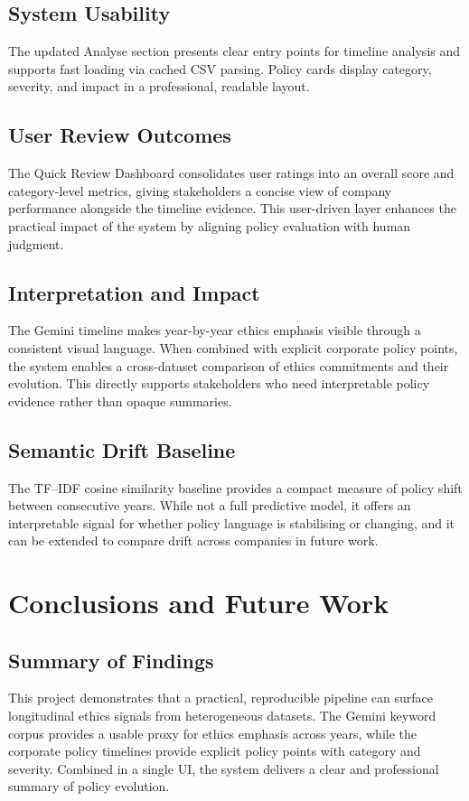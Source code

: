 \documentclass[conference]{IEEEtran}
\begin{document}
\subsection*{System Usability}
The updated Analyse section presents clear entry points for timeline analysis
and supports fast loading via cached CSV parsing. Policy cards display
category, severity, and impact in a professional, readable layout.

\subsection*{User Review Outcomes}
The Quick Review Dashboard consolidates user ratings into an overall score and
category-level metrics, giving stakeholders a concise view of company
performance alongside the timeline evidence. This user-driven layer enhances
the practical impact of the system by aligning policy evaluation with human
judgment.

\subsection*{Interpretation and Impact}
The Gemini timeline makes year-by-year ethics emphasis visible through a
consistent visual language. When combined with explicit corporate policy
points, the system enables a cross-dataset comparison of ethics commitments
and their evolution. This directly supports stakeholders who need interpretable
policy evidence rather than opaque summaries.

\subsection*{Semantic Drift Baseline}
The TF--IDF cosine similarity baseline provides a compact measure of policy
shift between consecutive years. While not a full predictive model, it offers
an interpretable signal for whether policy language is stabilising or changing,
and it can be extended to compare drift across companies in future work.

\section{Conclusions and Future Work}

\subsection*{Summary of Findings}
This project demonstrates that a practical, reproducible pipeline can surface
longitudinal ethics signals from heterogeneous datasets. The Gemini keyword
corpus provides a usable proxy for ethics emphasis across years, while the
corporate policy timelines provide explicit policy points with category and
severity. Combined in a single UI, the system delivers a clear and professional
summary of policy evolution.
\end{document}
